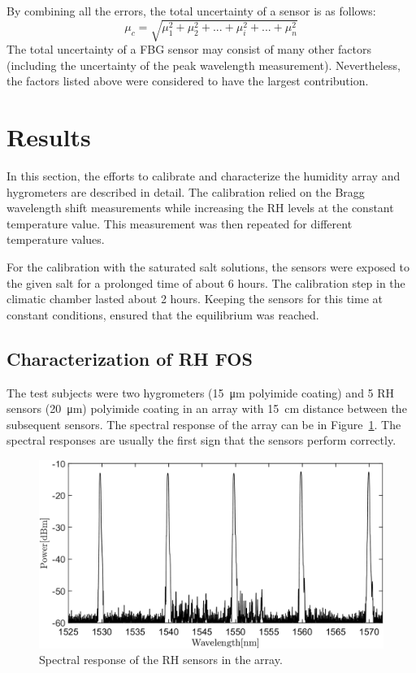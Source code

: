 By combining all the errors, the total uncertainty of a sensor is as follows:
\begin{equation}
    \mu_{c} = \sqrt{\mu_{1}^{2} + \mu_{2}^{2} + ... + \mu_{i}^{2} + ... + \mu_{n}^{2}}
\end{equation}
The total uncertainty of a \gls{FBG} sensor may consist of many other factors (including the uncertainty of the peak wavelength measurement). Nevertheless, the factors listed above were considered to have the largest contribution. 

\section{Results}
\label{fbg_results}
In this section, the efforts to calibrate and characterize the humidity array and hygrometers are described in detail. The calibration relied on the Bragg wavelength shift measurements while increasing the \gls{RH} levels at the constant temperature value. This measurement was then repeated for different temperature values.

For the calibration with the saturated salt solutions, the sensors were exposed to the given salt for a prolonged time of about 6 hours. The calibration step in the climatic chamber lasted about 2 hours. Keeping the sensors for this time at constant conditions, ensured that the equilibrium was reached. 
\subsection{Characterization of RH FOS}

The test subjects were two hygrometers (\SI{15}{\micro\metre} polyimide coating) and  5 \gls{RH} sensors (\SI{20}{\micro\metre}) polyimide coating in an array with \SI{15}{\cm} distance between the subsequent sensors. The spectral response of the array can be in Figure~\ref{fig_array_wavelength}. The spectral responses are usually the first sign that the sensors perform correctly. 

\begin{figure}[!h]
\centering
\includegraphics[width=0.85\columnwidth]{Chapter5/images/rh_array.png}
\caption{Spectral response of the RH sensors in the array.}
\label{fig_array_wavelength}
\end{figure}

